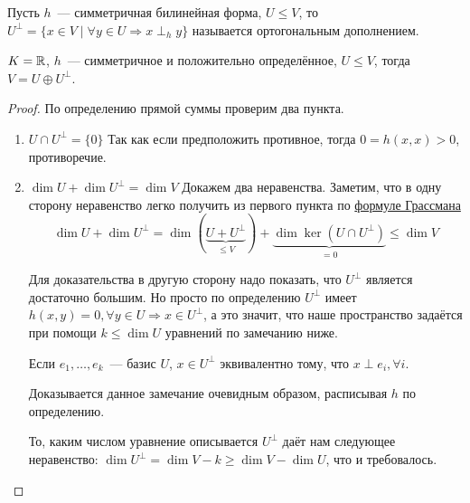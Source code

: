 \begin{definition}
    Пусть $h$~--- симметричная билинейная форма, $U\le V$, то $U^{\perp} = 
    \{x\in V \mid \forall y \in U \Rightarrow x\perp_h y\}$ называется ортогональным дополнением.
\end{definition}
\begin{theorem}
    $K = \mathbb{R}$, $h$~--- симметричное и положительно определённое, $U \le V$,
    тогда $V = U \oplus U^{\perp}$.
\end{theorem}
\begin{proof}\leavevmode
    По определению прямой суммы проверим два пункта.
    \begin{enumerate}
        \item
        $U\cap U^{\perp} = \{0\}$
        Так как если предположить противное, тогда $0 = h(x,x) > 0$, противоречие.
        \item 
        $\dim U + \dim U^{\perp} = \dim V$
        Докажем два неравенства. Заметим, что в одну сторону неравенство легко получить
        из первого пункта по \hyperref[thm:Формула Грассмана]{формуле Грассмана} 
        \[
             \dim U + \dim U^{\perp} = \dim (\underbrace{U + U^\perp}_{\le V}) + \underbrace{\dim \ker (U \cap U^\perp)}_{=0} \le \dim V
        \]

        Для доказательства в другую сторону надо показать, что $U^{\perp}$ является достаточно
        большим. Но просто по определению $U^\perp$ имеет $h(x, y) = 0, \forall y\in U \Rightarrow x\in U^\perp$, а это значит, что наше
        пространство задаётся при помощи $k \le \dim U$ уравнений по замечанию ниже.

        \begin{remark}
            Если $e_1,\dots, e_k$~--- базис $U$, 
            $x\in U^{\perp}$ эквивалентно тому, что $x \perp e_i, \forall i$.
        \end{remark}
        Доказывается данное замечание очевидным образом, расписывая $h$ по определению.

        То, каким числом уравнение описывается $U^\perp$ даёт нам следующее неравенство:
        $\dim U^{\perp} = \dim V - k \ge \dim V - \dim U$, что и требовалось.
    \end{enumerate}
\end{proof}
